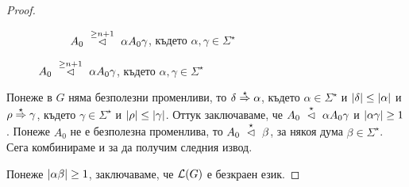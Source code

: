 \begin{proof}
\begin{figure}[H]
\begin{subfigure}[t]{0.5\textwidth}
      \caption{\scriptsize{$A_0 \yield{\geq n+1}\alpha A_0\gamma$, където $\alpha,\gamma \in \Sigma^\star$}}
    \end{subfigure}
  \end{figure}
    

  Понеже в $G$ няма безполезни променливи, то $\delta \derive{\star} \alpha$, където $\alpha \in \Sigma^\star$ и $\abs{\delta} \leq \abs{\alpha}$ и $\rho \derive{\star} \gamma$,
  където $\gamma \in \Sigma^\star$ и $\abs{\rho} \leq \abs{\gamma}$.
  Оттук заключаваме, че $A_0 \yield{\star} \alpha A_0 \gamma$ и $\abs{\alpha\gamma} \geq 1$.
  Понеже $A_0$ не е безполезна променлива, то $A_0 \yield{\star} \beta$, за някоя дума $\beta \in \Sigma^\star$.
  Сега комбинираме  и  за да получим следния извод.
  \begin{prooftree}
  \end{prooftree}
  Понеже $\abs{\alpha\beta} \geq 1$, заключаваме, че $\L(G)$ е безкраен език.
  

\end{proof}
